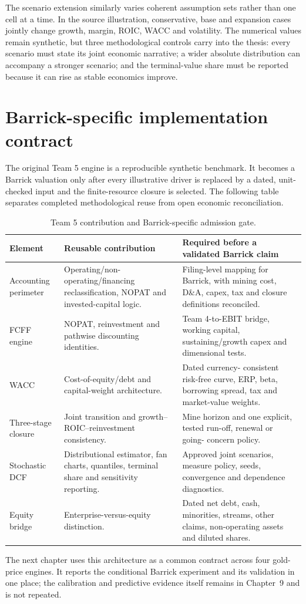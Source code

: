 The scenario extension similarly varies coherent assumption sets rather than
one cell at a time. In the source illustration, conservative, base and
expansion cases jointly change growth, margin, ROIC, WACC and volatility. The
numerical values remain synthetic, but three methodological controls carry
into the thesis: every scenario must state its joint economic narrative; a
wider absolute distribution can accompany a stronger scenario; and the
terminal-value share must be reported because it can rise as stable economics
improve.

\section{Barrick-specific implementation contract}

The original Team 5 engine is a reproducible synthetic benchmark. It becomes
a Barrick valuation only after every illustrative driver is replaced by a
dated, unit-checked input and the finite-resource closure is selected. The
following table separates completed methodological reuse from open economic
reconciliation.

\begin{table}[H]
\centering
\caption{Team 5 contribution and Barrick-specific admission gate.}
\label{tab:dcf-reuse-gates}
\small
\renewcommand{\arraystretch}{1.12}
\begin{tabularx}{\textwidth}{@{}p{2.7cm}X X@{}}
\toprule
Element & Reusable contribution & Required before a validated Barrick claim \\
\midrule
Accounting perimeter & Operating/non-operating/financing reclassification,
NOPAT and invested-capital logic. & Filing-level mapping for Barrick, with
mining cost, D\&A, capex, tax and closure definitions reconciled. \\
FCFF engine & NOPAT, reinvestment and pathwise discounting identities. & Team
4-to-EBIT bridge, working capital, sustaining/growth capex and dimensional
tests. \\
WACC & Cost-of-equity/debt and capital-weight architecture. & Dated currency-
consistent risk-free curve, ERP, beta, borrowing spread, tax and market-value
weights. \\
Three-stage closure & Joint transition and growth--ROIC--reinvestment
consistency. & Mine horizon and one explicit, tested run-off, renewal or going-
concern policy. \\
Stochastic DCF & Distributional estimator, fan charts, quantiles, terminal
share and sensitivity reporting. & Approved joint scenarios, measure policy,
seeds, convergence and dependence diagnostics. \\
Equity bridge & Enterprise-versus-equity distinction. & Dated net debt, cash,
minorities, streams, other claims, non-operating assets and diluted shares. \\
\bottomrule
\end{tabularx}
\end{table}

The next chapter uses this architecture as a common contract across four gold-
price engines. It reports the conditional Barrick experiment and its validation
in one place; the calibration and predictive evidence itself remains in
Chapter~9 and is not repeated.
